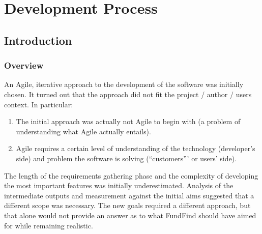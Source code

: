 \chapter{Development Process}



\section{Introduction}


\subsection{Overview}
An Agile, iterative approach to the development of the software was initially chosen. It turned out that the approach did not fit the project / author / users context. In particular:

\begin{enumerate}
 \item The initial approach was actually not Agile to begin with (a problem of understanding what Agile actually entails).
 \item Agile requires a certain level of understanding of the technology (developer's side) and problem the software is solving (``customers''' or users' side).
\end{enumerate}

The length of the requirements gathering phase and the complexity of developing the most important features was initially underestimated. Analysis of the intermediate outputs and measurement against the initial aims suggested that a different scope was necessary. The new goals required a different approach, but that alone would not provide an answer as to what FundFind should have aimed for while remaining realistic.

